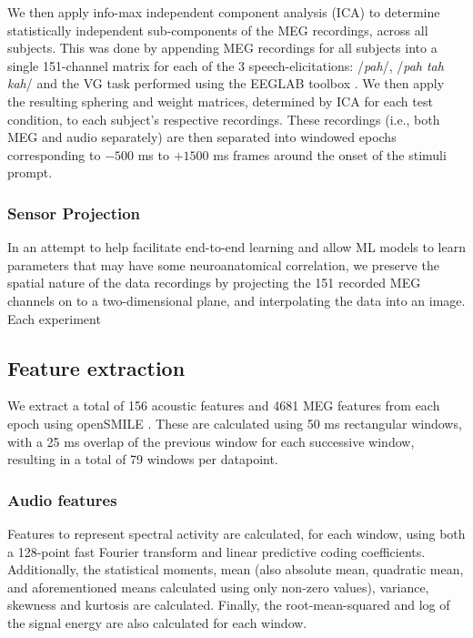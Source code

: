 \documentclass[utf8]{frontiersSCNS} %
\begin{document}
We then apply info-max independent component analysis (ICA) \cite{Bell1995} to determine statistically independent sub-components of the MEG recordings, across all subjects. This was done by appending MEG recordings for all subjects into a single 151-channel matrix for each of the 3 speech-elicitations: /{\em pah}/, /{\em pah tah kah}/ and the VG task performed using the EEGLAB toolbox \cite{Delorme04eeglab}. We then apply the resulting sphering and weight matrices, determined by ICA for each test condition, to each subject's respective recordings. These recordings (i.e., both MEG and audio separately) are then separated into windowed epochs corresponding to $-500$ ms to $+1500$ ms frames around the onset of the stimuli prompt.

\subsubsection{Sensor Projection}

In an attempt to help facilitate end-to-end learning and allow ML models to learn parameters that may have some neuroanatomical correlation, we preserve the spatial nature of the data recordings by projecting the 151 recorded MEG channels on to a two-dimensional plane, and interpolating the data into an image. Each experiment 

\subsection{Feature extraction}

We extract a total of 156 acoustic features and 4681 MEG features from each epoch using openSMILE \cite{Eyben13-RDI}. These are calculated using 50 ms rectangular windows, with a 25 ms overlap of the previous window for each successive window, resulting in a total of 79 windows per datapoint.

\subsubsection{Audio features}

Features to represent spectral activity are calculated, for each window, using both a 128-point fast Fourier transform and linear predictive coding coefficients. Additionally, the statistical moments, mean (also absolute mean, quadratic mean, and aforementioned means calculated using only non-zero values), variance, skewness and kurtosis are calculated. Finally, the root-mean-squared and log of the signal energy are also calculated for each window.
\end{document}

